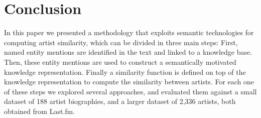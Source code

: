 
\section{Conclusion} %
\label{sec:conclusion}

In this paper we presented a methodology that exploits semantic technologies for computing artist similarity, which can be divided in three main steps: First, named entity mentions are identified in the text and linked to a knowledge base. Then, these entity mentions are used to construct a semantically motivated knowledge representation.
Finally a similarity function is defined on top of the knowledge representation to compute the similarity between artists.
For each one of these steps we explored several approaches, and evaluated them against a small dataset of 188 artist biographies, and a larger dataset of 2,336 artists, both obtained from Last.fm.

